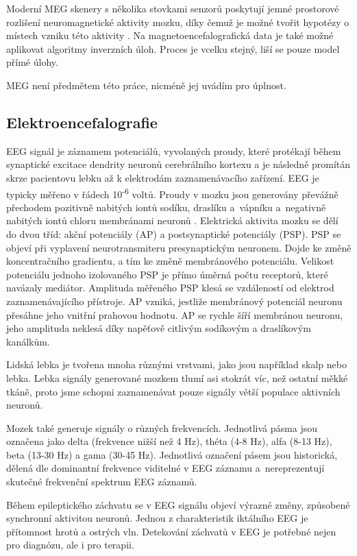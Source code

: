 Moderní MEG skenery s několika stovkami senzorů poskytují jemné prostorové rozlišení neuromagnetické aktivity mozku, díky čemuž je možné tvořit hypotézy o místech vzniku této aktivity \cite{6}. Na magnetoencefalografická data je také možné aplikovat algoritmy inverzních úloh. Proces je vcelku stejný, liší se pouze model přímé úlohy. 

MEG není předmětem této práce, nicméně jej uvádím pro úplnost.

\subsection{Elektroencefalografie}
EEG signál je záznamem potenciálů, vyvolaných proudy, které protékají během synaptické excitace dendrity neuronů cerebrálního kortexu a je následně promítán skrze pacientovu lebku až k elektrodám zaznamenávacího zařízení. EEG je typicky měřeno v řádech 10\textsuperscript{-6} voltů. Proudy v mozku jsou generovány převážně přechodem pozitivně nabitých iontů sodíku, draslíku a~vápníku a~negativně nabitých iontů chloru membránami neuronů \cite{10}. Elektrická aktivita mozku se dělí do dvou tříd: akční potenciály (AP) a postsynaptické potenciály (PSP). PSP se objeví při vyplavení neurotransmiteru presynaptickým neuronem. Dojde ke změně koncentračního gradientu, a tím ke změně membránového potenciálu. Velikost potenciálu jednoho izolovaného PSP je přímo úměrná počtu receptorů, které navázaly mediátor. Amplituda měřeného PSP klesá se vzdáleností od elektrod zaznamenávajícího přístroje. AP vzniká, jestliže membránový potenciál neuronu přesáhne jeho vnitřní prahovou hodnotu. AP se rychle šíří membránou neuronu, jeho amplituda neklesá díky napěťově citlivým sodíkovým a draslíkovým kanálkům. \cite{12}

Lidská lebka je tvořena mnoha různými vrstvami, jako jsou například skalp nebo lebka. Lebka signály generované mozkem tlumí asi stokrát víc, než ostatní měkké tkáně, proto jsme schopni zaznamenávat pouze signály větší populace aktivních neuronů. \cite{10}

Mozek také generuje signály o různých frekvencích. Jednotlivá pásma jsou označena jako delta (frekvence nižší než 4 Hz), théta (4-8 Hz), alfa (8-13 Hz), beta (13-30 Hz) a gama (30-45 Hz). \cite{10,11} Jednotlivá označení pásem jsou historická, dělená dle dominantní frekvence viditelné v EEG záznamu a~nereprezentují skutečné frekvenční spektrum EEG záznamů.  

Během epileptického záchvatu se v EEG signálu objeví výrazné změny, způsobené synchronní aktivitou neuronů. Jednou z charakteristik iktálního EEG je přítomnost hrotů a ostrých vln. Detekování záchvatů v EEG je potřebné nejen pro diagnózu, ale i pro terapii. \cite{14}


